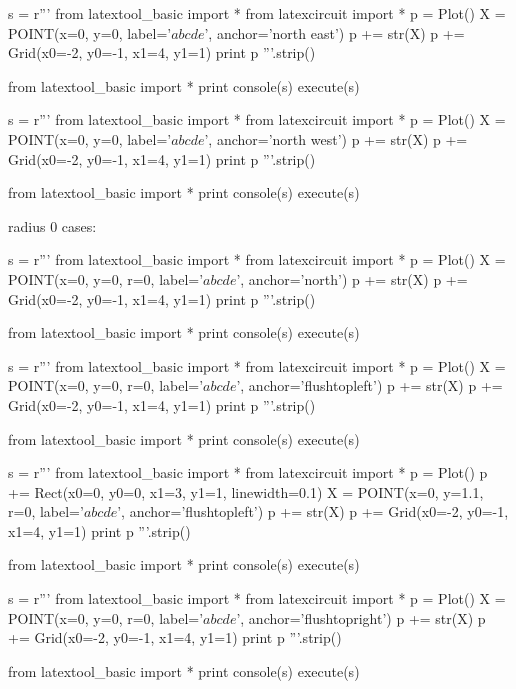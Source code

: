 \begin{python}
s = r'''
from latextool_basic import *
from latexcircuit import *
p = Plot()
X = POINT(x=0, y=0, label='$abcde$', anchor='north east')
p += str(X)
p += Grid(x0=-2, y0=-1, x1=4, y1=1)
print p
'''.strip()

from latextool_basic import *
print console(s)
execute(s)
\end{python}

\begin{python}
s = r'''
from latextool_basic import *
from latexcircuit import *
p = Plot()
X = POINT(x=0, y=0, label='$abcde$', anchor='north west')
p += str(X)
p += Grid(x0=-2, y0=-1, x1=4, y1=1)
print p
'''.strip()

from latextool_basic import *
print console(s)
execute(s)
\end{python}



\newpage
radius 0 cases:
\begin{python}
s = r'''
from latextool_basic import *
from latexcircuit import *
p = Plot()
X = POINT(x=0, y=0, r=0, label='$abcde$', anchor='north')
p += str(X)
p += Grid(x0=-2, y0=-1, x1=4, y1=1)
print p
'''.strip()

from latextool_basic import *
print console(s)
execute(s)
\end{python}


\newpage
\begin{python}
s = r'''
from latextool_basic import *
from latexcircuit import *
p = Plot()
X = POINT(x=0, y=0, r=0, label='$abcde$', anchor='flushtopleft')
p += str(X)
p += Grid(x0=-2, y0=-1, x1=4, y1=1)
print p
'''.strip()

from latextool_basic import *
print console(s)
execute(s)
\end{python}

\begin{python}
s = r'''
from latextool_basic import *
from latexcircuit import *
p = Plot()
p += Rect(x0=0, y0=0, x1=3, y1=1, linewidth=0.1)
X = POINT(x=0, y=1.1, r=0, label='$abcde$', anchor='flushtopleft')
p += str(X)
p += Grid(x0=-2, y0=-1, x1=4, y1=1)
print p
'''.strip()

from latextool_basic import *
print console(s)
execute(s)
\end{python}



\newpage
\begin{python}
s = r'''
from latextool_basic import *
from latexcircuit import *
p = Plot()
X = POINT(x=0, y=0, r=0, label='$abcde$', anchor='flushtopright')
p += str(X)
p += Grid(x0=-2, y0=-1, x1=4, y1=1)
print p
'''.strip()

from latextool_basic import *
print console(s)
execute(s)
\end{python}

